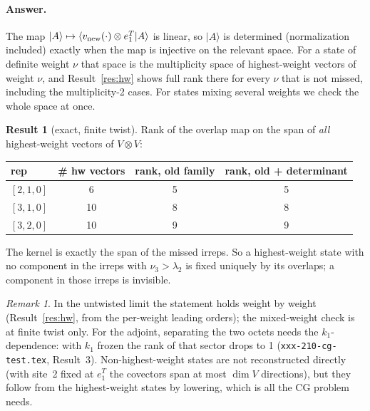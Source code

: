 \documentclass[11pt]{article}
\newcommand{\nb}[1]{\texttt{#1}}
\theoremstyle{definition}
\newtheorem{result}{Result}
\theoremstyle{remark}
\newtheorem*{remark}{Remark}
\begin{document}
\paragraph{Answer.}
The map $|A\rangle\mapsto\langle v_{\rm new}(\cdot)\otimes e_1^T|A\rangle$ is linear, so $|A\rangle$ is determined (normalization included) exactly when the map is injective on the relevant space. For a state of definite weight $\nu$ that space is the multiplicity space of highest-weight vectors of weight $\nu$, and Result~\ref{res:hw} shows full rank there for every $\nu$ that is not missed, including the multiplicity-2 cases. For states mixing several weights we check the whole space at once.

\begin{result}[exact, finite twist]\label{res:recon}
Rank of the overlap map on the span of \emph{all} highest-weight vectors of $V\otimes V$:
\begin{center}
\begin{tabular}{lccc}\toprule
rep & \# hw vectors & rank, old family & rank, old + determinant\\\midrule
$[2,1,0]$ & 6 & 5 & 5\\
$[3,1,0]$ & 10 & 8 & 8\\
$[3,2,0]$ & 10 & 9 & 9\\\bottomrule
\end{tabular}
\end{center}
The kernel is exactly the span of the missed irreps. So a highest-weight state with no component in the irreps with $\nu_3>\lambda_2$ is fixed uniquely by its overlaps; a component in those irreps is invisible.
\end{result}

\begin{remark}
In the untwisted limit the statement holds weight by weight (Result~\ref{res:hw}, from the per-weight leading orders); the mixed-weight check is at finite twist only. For the adjoint, separating the two octets needs the $k_1$-dependence: with $k_1$ frozen the rank of that sector drops to 1 (\nb{xxx-210-cg-test.tex}, Result~3). Non-highest-weight states are not reconstructed directly (with site~2 fixed at $e_1^T$ the covectors span at most $\dim V$ directions), but they follow from the highest-weight states by lowering, which is all the CG problem needs.
\end{remark}

\end{document}
